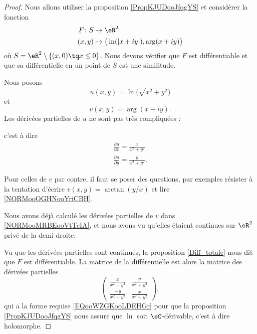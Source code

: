 \begin{proof}
    Nous allons utiliser la proposition \ref{PropKJUDooJfqgYS} et considérer la fonction
    \begin{equation}
        \begin{aligned}
            F\colon S&\to \eR^2 \\
            (x,y)&\mapsto \big( \ln(| x+iy |),\arg(x+iy) \big) 
        \end{aligned}
    \end{equation}
    où \( S=\eR^2\setminus\{ (x,0)\tq x\leq 0 \}\). Nous devons vérifier que \( F\) est différentiable et que sa différentielle en un point de \( S\) est une similitude.

    Nous posons
    \begin{equation}
        u(x,y)=\ln\big( \sqrt{ x^2+y^2 } \big)
    \end{equation}
    et
    \begin{equation}
        v(x,y)=\arg(x+iy).
    \end{equation}
    Les dérivées partielles de \( u\) ne sont pas très compliquées : 
    
    c'est à dire
    \begin{subequations}
        \begin{align}
            \frac{ \partial u }{ \partial x }=\frac{ x }{ x^2+y^2 }\\
            \frac{ \partial u }{ \partial y }=\frac{ y }{ x^2+y^2 }.
        \end{align}
    \end{subequations}

    Pour celles de \( v \) par contre, il faut se poser des questions, par exemples résister à la tentation d'écrire \( v(x,y)=\arctan(y/x)\) et lire \ref{NORMooOGHNooYriCBH}.  

    Nous avons déjà calculé les dérivées partielles de \( v\) dans \ref{NORMooMRBEooVtTcIA}, et nous avons vu qu'elles étaient continues sur \( \eR^2\) privé de la demi-droite.

    Vu que les dérivées partielles sont continues, la proposition \ref{Diff_totale} nous dit que \( F\) est différentiable. La matrice de la différentielle est alors la matrice des dérivées partielles
    \begin{equation}
        \begin{pmatrix}
            \frac{ x }{ x^2+y^2 }    &   \frac{ y }{ x^2+y^2 }    \\ 
            \frac{ -y }{ x^2+y^2 }    &   \frac{ x }{ x^2+y^2 }    
        \end{pmatrix},
    \end{equation}
    qui a la forme requise \eqref{EQooWZGKooLDEHGr} pour que la proposition \ref{PropKJUDooJfqgYS} nous assure que \( \ln\) soit \( \eC\)-dérivable, c'est à dire holomorphe.
\end{proof}

